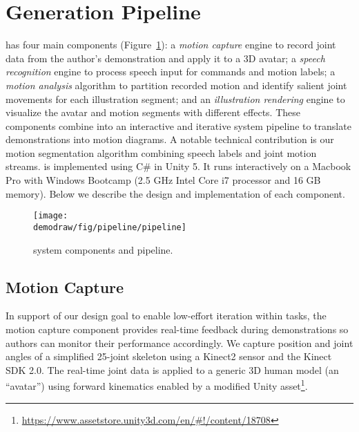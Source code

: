 
\section{Generation Pipeline}

\systemname{} has four main components (Figure~\ref{fig:pipeline}):
%
a \emph{motion capture} engine to record joint data from the author's demonstration and apply it to a 3D avatar;
%
a \emph{speech recognition} engine to process speech input for commands and motion labels;
%
a \emph{motion analysis} algorithm to partition recorded motion and identify salient joint movements for each illustration segment;
%
and an \emph{illustration rendering} engine to visualize the avatar and motion segments with different effects.
%
These components combine into an interactive and iterative system pipeline to translate demonstrations into motion diagrams.
A notable technical contribution is our motion segmentation algorithm combining speech labels and joint motion streams.
%
\systemname{} is implemented using C\# in Unity 5. %
It runs interactively on a Macbook Pro with Windows Bootcamp (2.5 GHz Intel Core i7 processor and 16 GB memory).
%
Below we describe the design and implementation of each component.

\begin{figure}[t]
  \centering
  \texttt{[image: \\demodraw/fig/pipeline/pipeline]}
  \caption{\systemname{} system components and pipeline.}
  \label{fig:pipeline}
\end{figure}


\subsection{Motion Capture}

In support of our design goal to enable low-effort iteration within tasks, the motion capture component provides real-time feedback during demonstrations so authors can monitor their performance accordingly.
We capture position and joint angles of a simplified 25-joint skeleton using a Kinect2 sensor and the Kinect SDK 2.0. %
The real-time joint data is applied to a generic 3D human model (an ``avatar'') using forward kinematics enabled by a modified Unity asset\footnote{\url{https://www.assetstore.unity3d.com/en/\#!/content/18708}}.

